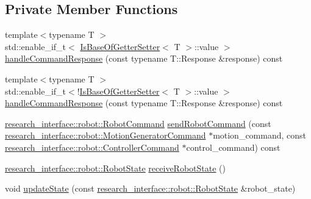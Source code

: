 \subsection*{Private Member Functions}
\begin{DoxyCompactItemize}
\item 
{\footnotesize template$<$typename T $>$ }\\std\+::enable\+\_\+if\+\_\+t$<$ \hyperlink{classfranka_1_1Robot_1_1Impl_a42d57d169b53c906439dbbde255c1bae}{Is\+Base\+Of\+Getter\+Setter}$<$ T $>$\+::value $>$ \hyperlink{classfranka_1_1Robot_1_1Impl_ac281e9292f59718758b2c9897b004776}{handle\+Command\+Response} (const typename T\+::\+Response \&response) const
\item 
{\footnotesize template$<$typename T $>$ }\\std\+::enable\+\_\+if\+\_\+t$<$!\hyperlink{classfranka_1_1Robot_1_1Impl_a42d57d169b53c906439dbbde255c1bae}{Is\+Base\+Of\+Getter\+Setter}$<$ T $>$\+::value $>$ \hyperlink{classfranka_1_1Robot_1_1Impl_a939a959d9bb69ad7567d7d3a2aabea3e}{handle\+Command\+Response} (const typename T\+::\+Response \&response) const
\item 
\hyperlink{structresearch__interface_1_1robot_1_1RobotCommand}{research\+\_\+interface\+::robot\+::\+Robot\+Command} \hyperlink{classfranka_1_1Robot_1_1Impl_a4c927a26f2a6eceb352ce3af49d28c37}{send\+Robot\+Command} (const \hyperlink{structresearch__interface_1_1robot_1_1MotionGeneratorCommand}{research\+\_\+interface\+::robot\+::\+Motion\+Generator\+Command} $\ast$motion\+\_\+command, const \hyperlink{structresearch__interface_1_1robot_1_1ControllerCommand}{research\+\_\+interface\+::robot\+::\+Controller\+Command} $\ast$control\+\_\+command) const
\item 
\hyperlink{structresearch__interface_1_1robot_1_1RobotState}{research\+\_\+interface\+::robot\+::\+Robot\+State} \hyperlink{classfranka_1_1Robot_1_1Impl_a15161988fd2644aa2757e196e4488b38}{receive\+Robot\+State} ()
\item 
void \hyperlink{classfranka_1_1Robot_1_1Impl_a79e762e0bc2fe77fdfe7614963883be7}{update\+State} (const \hyperlink{structresearch__interface_1_1robot_1_1RobotState}{research\+\_\+interface\+::robot\+::\+Robot\+State} \&robot\+\_\+state)
\end{DoxyCompactItemize}
